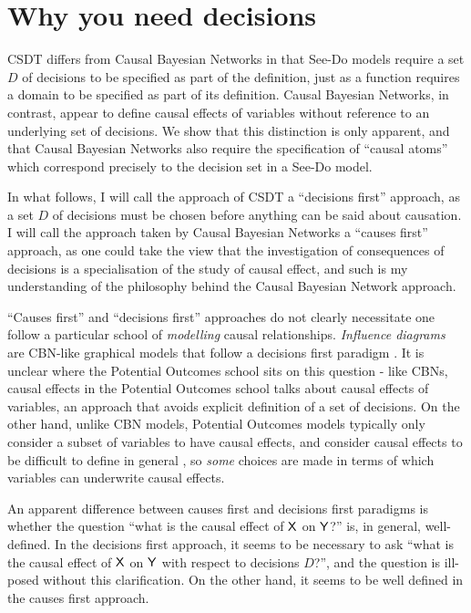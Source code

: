 

\section{Why you need decisions}

CSDT differs from Causal Bayesian Networks in that See-Do models require a set $D$ of decisions to be specified as part of the definition, just as a function requires a domain to be specified as part of its definition. Causal Bayesian Networks, in contrast, appear to define causal effects of variables without reference to an underlying set of decisions. We show that this distinction is only apparent, and that Causal Bayesian Networks also require the specification of ``causal atoms'' which correspond precisely to the decision set in a See-Do model.

In what follows, I will call the approach of CSDT a ``decisions first'' approach, as a set $D$ of decisions must be chosen before anything can be said about causation. I will call the approach taken by Causal Bayesian Networks a ``causes first'' approach, as one could take the view that the investigation of consequences of decisions is a specialisation of the study of causal effect, and such is my understanding of the philosophy behind the Causal Bayesian Network approach.

``Causes first'' and ``decisions first'' approaches do not clearly necessitate one follow a particular school of \emph{modelling} causal relationships. \emph{Influence diagrams} are CBN-like graphical models that follow a decisions first paradigm \citep{peters_elements_2017,woodward_causation_2016,dawid_influence_2002}. It is unclear where the Potential Outcomes school sits on this question - like CBNs, causal effects in the Potential Outcomes school talks about causal effects of variables, an approach that avoids explicit definition of a set of decisions. On the other hand, unlike CBN models, Potential Outcomes models typically only consider a subset of variables to have causal effects, and consider causal effects to be difficult to define in general \citep{rubin_causal_2005}, so \emph{some} choices are made in terms of which variables can underwrite causal effects.

An apparent difference between causes first and decisions first paradigms is whether the question ``what is the causal effect of $\mathsf{X}$ on $\mathsf{Y}$?'' is, in general, well-defined. In the decisions first approach, it seems to be necessary to ask ``what is the causal effect of $\mathsf{X}$ on $\mathsf{Y}$ with respect to decisions $D$?'', and the question is ill-posed without this clarification. On the other hand, it seems to be well defined in the causes first approach.

